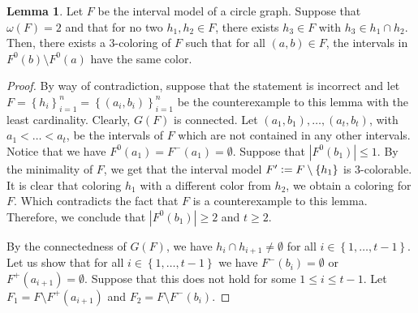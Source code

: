 \documentclass[12pt]{article}
\theoremstyle{definition}
\newtheorem{lemma}[thm]{Lemma}
\newcommand{\defeq}{\vcentcolon=}
\begin{document}
    \begin{lemma} \label{lemma:4.4}
        Let $F$ be the interval
        model of a circle graph.
        Suppose that $\omega\left(F\right) = 2$ 
        and that for no two
        $h_1, h_2 \in F$,
        there exists $h_3 \in F$ 
        with $h_3 \in h_1 \cap h_2$.
        Then, there exists a 3-coloring
        of $F$ such that 
        for all
        $\left(a, b\right) \in F$, 
        the intervals in $F^{0}\left(b\right) 
        \setminus F^{0}\left(a\right)$
        have the same color.
    \end{lemma}
    \begin{proof}
        By way of contradiction,
        suppose that the statement is incorrect
        and let $F = \left\{h_{i}\right\}_{i = 1}^{n} =
        \left\{\left(a_{i}, b_{i}\right)\right\}_{i = 1}^{n}$
        be the counterexample
        to this lemma with the
        least cardinality.
        Clearly, $G\left(F\right)$ is 
        connected.
        Let $\left(a_1, b_1\right),
        \ldots, \left(a_{t}, b_{t}\right)$,
        with $a_1 < \ldots < a_{t}$,
        be the intervals of $F$ which
        are not contained in any other 
        intervals. Notice that we have
        $F^{0}\left(a_{1}\right) = 
        F^{-}\left(a_1\right) = \emptyset$.
        Suppose that $\left|F^{0}\left(b_1\right)\right| \leq 1$.
        By the minimality of $F$,
        we get that the interval
        model $F' \defeq F \setminus \left\{h_{1}\right\}$ 
        is 3-colorable. It is clear
        that coloring $h_1$ with a different
        color from $h_2$, we obtain a coloring
        for $F$. Which contradicts the fact
        that $F$ is a counterexample to this lemma.
        Therefore, we conclude that $\left|F^{0}\left(b_1\right)\right| \geq 2$ 
        and $t \geq 2$.

        By the connectedness of $G\left(F\right)$,
        we have $h_{i} \cap h_{i+1} \neq \emptyset$ 
        for all $i \in \left\{1, \ldots, t -1\right\}$.
        Let us show that 
        for all
        $i \in \left\{1, \ldots, t - 1\right\}$
        we have
        $F^{-}\left(b_{i}\right) = \emptyset$ 
        or $F^{+}\left(a_{i+1}\right) = \emptyset$.
        Suppose that this does not
        hold for some $1 \leq i \leq t - 1$.
        Let $F_1 = F \setminus F^{+}\left(a_{i+1}\right)$
        and $F_2 = F \setminus F^{-}\left(b_{i}\right)$.
        

\end{proof}
\end{document}
